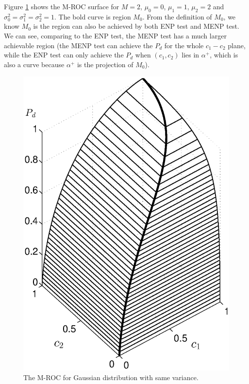 Figure \ref{pic: surface for same variance} shows the M-ROC surface for $M=2$, $\mu_0 = 0$, $\mu_1 = 1$, $\mu_2 = 2$ and $\sigma_0^2 = \sigma_1^2 = \sigma_2^2 = 1$. The bold curve is region $M_0$. From the definition of $M_0$, we know $M_0$ is the region can also be achieved by both ENP test and MENP test. We can see, comparing to the ENP test, the MENP test has a much larger achievable region (the MENP test can achieve the $P_d$ for the whole $c_1-c_2$ plane, while the ENP test can only achieve the $P_d$ when $(c_1, c_2)$ lies in $\alpha^+$, which is also a curve because $\alpha^+$ is the projection of $M_0$). 

\begin{figure}[!t]
\centering
\includegraphics[width=12cm, height=16cm]{3/gaussian.eps}
\caption{The M-ROC for Gaussian distribution with same variance.}
\label{pic: surface for same variance}
\end{figure}
